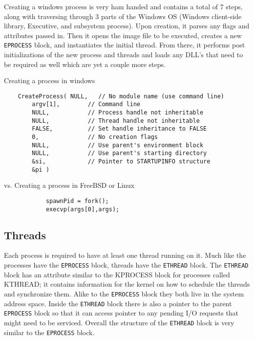 \documentclass[10pt,conference,draftclsnofoot,onecolumn]{IEEEtran}
\begin{document}
    Creating a windows process is very ham handed and contains a total of 7 steps, along with traversing through 3 parts of the Windows OS (Windows client-side library, Executive, and subsystem process). Upon creation, it parses any flags and attributes passed in. Then it opens the image file to be executed, creates a new \texttt{EPROCESS} block, and instantiates the initial thread. From there, it performs post initializations of the new process and threads and loads any DLL’s that need to be required as well which are yet a couple more steps\cite{1}.
    
    \center Creating a process in windows 
    \begin{lstlisting}
    CreateProcess( NULL,   // No module name (use command line)
        argv[1],        // Command line
        NULL,           // Process handle not inheritable
        NULL,           // Thread handle not inheritable
        FALSE,          // Set handle inheritance to FALSE
        0,              // No creation flags
        NULL,           // Use parent's environment block
        NULL,           // Use parent's starting directory 
        &si,            // Pointer to STARTUPINFO structure
        &pi ) 
    \end{lstlisting} 
    
    \center vs. Creating a process in FreeBSD or Linux
    
    \begin{lstlisting}
        	spawnPid = fork();
        	execvp(args[0],args); 
    \end{lstlisting}
    
\subsection{Threads}
    Each process is required to have at least one thread running on it. Much like the processes have the \texttt{EPROCESS} block, threads have the \texttt{ETHREAD} block. The \texttt{ETHREAD} block has an attribute similar to the KPROCESS block for processes called KTHREAD; it contains information for the kernel on how to schedule the threads and synchronize them\cite{1}. Alike to the \texttt{EPROCESS} block they both live in the system address space. Inside the \texttt{ETHREAD} block there is also a pointer to the parent \texttt{EPROCESS} block so that it can access pointer to any pending I/O requests that might need to be serviced. Overall the structure of the \texttt{ETHREAD} block is very similar to the \texttt{EPROCESS} block. 
\end{document}
